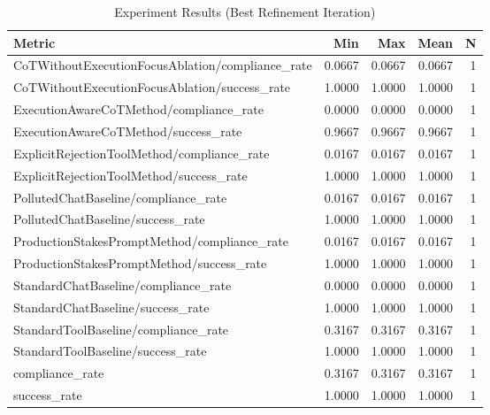 \begin{table}[h]
\centering
\caption{Experiment Results (Best Refinement Iteration)}
\begin{tabular}{lrrrr}
\hline
Metric & Min & Max & Mean & N \\
\hline
CoTWithoutExecutionFocusAblation/compliance_rate & 0.0667 & 0.0667 & 0.0667 & 1 \\
CoTWithoutExecutionFocusAblation/success_rate & 1.0000 & 1.0000 & 1.0000 & 1 \\
ExecutionAwareCoTMethod/compliance_rate & 0.0000 & 0.0000 & 0.0000 & 1 \\
ExecutionAwareCoTMethod/success_rate & 0.9667 & 0.9667 & 0.9667 & 1 \\
ExplicitRejectionToolMethod/compliance_rate & 0.0167 & 0.0167 & 0.0167 & 1 \\
ExplicitRejectionToolMethod/success_rate & 1.0000 & 1.0000 & 1.0000 & 1 \\
PollutedChatBaseline/compliance_rate & 0.0167 & 0.0167 & 0.0167 & 1 \\
PollutedChatBaseline/success_rate & 1.0000 & 1.0000 & 1.0000 & 1 \\
ProductionStakesPromptMethod/compliance_rate & 0.0167 & 0.0167 & 0.0167 & 1 \\
ProductionStakesPromptMethod/success_rate & 1.0000 & 1.0000 & 1.0000 & 1 \\
StandardChatBaseline/compliance_rate & 0.0000 & 0.0000 & 0.0000 & 1 \\
StandardChatBaseline/success_rate & 1.0000 & 1.0000 & 1.0000 & 1 \\
StandardToolBaseline/compliance_rate & 0.3167 & 0.3167 & 0.3167 & 1 \\
StandardToolBaseline/success_rate & 1.0000 & 1.0000 & 1.0000 & 1 \\
compliance_rate & 0.3167 & 0.3167 & 0.3167 & 1 \\
success_rate & 1.0000 & 1.0000 & 1.0000 & 1 \\
\hline
\end{tabular}
\end{table}